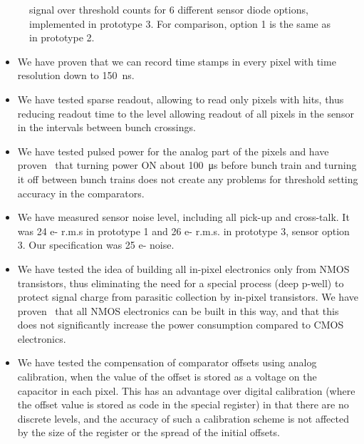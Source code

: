 \begin{figure}
\begin{minipage}[t]{0.35\textwidth}
        \caption{ signal over threshold counts for 6 different sensor diode options,
implemented in prototype 3. For comparison, option 1 is the same as in prototype 2.}
        \label{fig:VertexDetector:ChronoPixel:Fe55Response}
    \end{minipage}
\end{figure}

\begin{itemize}
    \item We have proven that we can record time stamps in every pixel with time resolution down to \SI{150}{ns}.
    \item We have tested sparse readout, allowing to read only pixels with hits, thus reducing readout time to the level allowing readout of all pixels in the sensor in the intervals between bunch crossings.
    \item We have tested pulsed power for the analog part of the pixels and have proven~\cite{sinev:Chronopix:FirstPrototype} that turning power ON about \SI{100}{\micro\second} before bunch train and turning it off between bunch trains does not create any problems for threshold setting accuracy in the comparators.
    \item We have measured sensor noise level, including all pick-up and cross-talk. It was 24 e- r.m.s in prototype 1 and 26 e- r.m.s. in prototype 3, sensor option 3. Our specification was 25 e- noise.
    \item We have tested the idea of building all in-pixel electronics only from NMOS transistors, thus eliminating the need for a special process (deep p-well) to protect signal charge from parasitic collection by in-pixel transistors. We have proven~\cite{sinev:Chronopixel:RnDstatus2013} that all NMOS electronics can be built in this way, and that this does not significantly increase the power consumption compared to CMOS electronics.
    \item We have tested the compensation of comparator offsets using analog calibration, when the value of the offset is stored as a voltage on the capacitor in each pixel. This has an advantage over digital calibration (where the offset value is stored as code in the special register) in that there are no discrete levels, and the accuracy of such a calibration scheme is not affected by the size of the register or the spread of the initial offsets.
\end{itemize}

